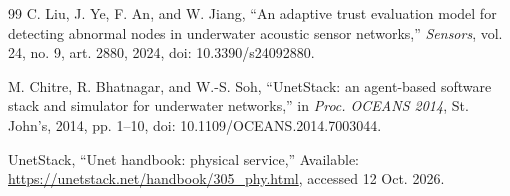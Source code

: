 \documentclass{article}
\begin{document}
\begin{thebibliography}{99}
C. Liu, J. Ye, F. An, and W. Jiang,
``An adaptive trust evaluation model for detecting abnormal nodes in underwater acoustic sensor networks,''
\emph{Sensors}, vol. 24, no. 9, art. 2880, 2024,
doi: 10.3390/s24092880.

M. Chitre, R. Bhatnagar, and W.-S. Soh,
``UnetStack: an agent-based software stack and simulator for underwater networks,''
in \emph{Proc. OCEANS 2014}, St. John's, 2014, pp. 1--10,
doi: 10.1109/OCEANS.2014.7003044.

UnetStack,
``Unet handbook: physical service,''
Available: \url{https://unetstack.net/handbook/305_phy.html}, accessed 12 Oct. 2026.

\end{thebibliography}
\end{document}

